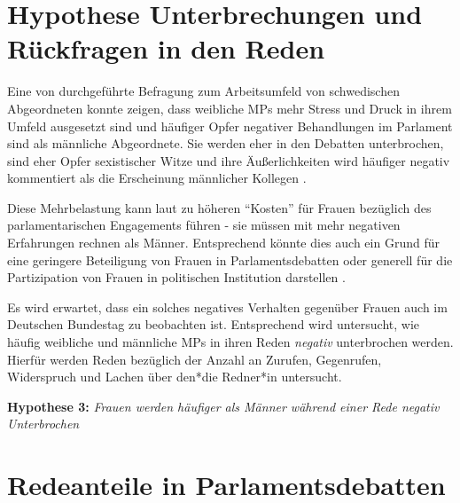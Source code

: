 \documentclass[12pt, 
    twoside=false, 
    bibliography=totoc, 
    numbers=endperiod, 
    headings=normal, 
    toc=chapterentrydotfill
    ]{scrbook}
\begin{document}
\section{Hypothese Unterbrechungen und Rückfragen in den Reden}\label{kapitel:hypothese3}

Eine von \textcite{erikson_2018} durchgeführte Befragung zum Arbeitsumfeld von schwedischen Abgeordneten konnte zeigen, dass weibliche MPs mehr Stress und Druck in ihrem Umfeld ausgesetzt sind und häufiger Opfer negativer Behandlungen im Parlament sind als männliche Abgeordnete. Sie werden eher in den Debatten unterbrochen, sind eher Opfer sexistischer Witze und ihre Äußerlichkeiten wird häufiger negativ kommentiert als die Erscheinung männlicher Kollegen \parencite[13]{erikson_2018}.

Diese Mehrbelastung kann laut \textcite{erikson_2018} zu höheren \enquote{Kosten} für Frauen bezüglich des parlamentarischen Engagements führen - sie müssen mit mehr negativen Erfahrungen rechnen als Männer. Entsprechend könnte dies auch ein Grund für eine geringere Beteiligung von Frauen in Parlamentsdebatten oder generell für die Partizipation von Frauen in politischen Institution darstellen \parencites[vgl.][]{erikson_2018}[vgl.][]{back_2014}.

Es wird erwartet, dass ein solches negatives Verhalten gegenüber Frauen auch im Deutschen Bundestag zu beobachten ist. Entsprechend wird untersucht, wie häufig weibliche und männliche MPs in ihren Reden \emph{negativ} unterbrochen werden. Hierfür werden Reden bezüglich der Anzahl an Zurufen, Gegenrufen, Widerspruch und Lachen über den*die Redner*in untersucht.

\textbf{Hypothese 3:} \emph{Frauen werden häufiger als Männer während einer Rede negativ Unterbrochen}



\section{Redeanteile in Parlamentsdebatten}\label{kap:redenanteile}
\end{document}
